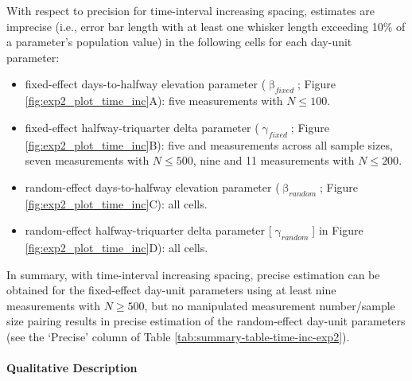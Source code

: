 \documentclass[
12pt, %
twoside,
english]{guelphthesis}
\begin{document}
With respect to precision for time-interval increasing spacing, estimates are imprecise (i.e., error bar length with at least one whisker length exceeding 10\% of a parameter's population value) in the following cells for each day-unit parameter:
\begin{itemize}
\tightlist
\item
  fixed-effect days-to-halfway elevation parameter (\(\upbeta_{fixed}\); Figure \ref{fig:exp2_plot_time_inc}A): five measurements with \(N \le 100\).
\item
  fixed-effect halfway-triquarter delta parameter (\(\upgamma_{fixed}\); Figure \ref{fig:exp2_plot_time_inc}B): five and measurements across all sample sizes, seven measurements with \(N \le 500\), nine and 11 measurements with \(N \le 200\).
\item
  random-effect days-to-halfway elevation parameter (\(\upbeta_{random}\); Figure \ref{fig:exp2_plot_time_inc}C): all cells.
\item
  random-effect halfway-triquarter delta parameter {[}\(\upgamma_{random}\){]} in Figure \ref{fig:exp2_plot_time_inc}D): all cells.
\end{itemize}
In summary, with time-interval increasing spacing, precise estimation can be obtained for the fixed-effect day-unit parameters using at least nine measurements with \(N \ge 500\), but no manipulated measurement number/sample size pairing results in precise estimation of the random-effect day-unit parameters (see the `Precise' column of Table \ref{tab:summary-table-time-inc-exp2}).

\hypertarget{qualitative-time-inc-exp2}{%
\paragraph{Qualitative Description}\label{qualitative-time-inc-exp2}}
\end{document}

